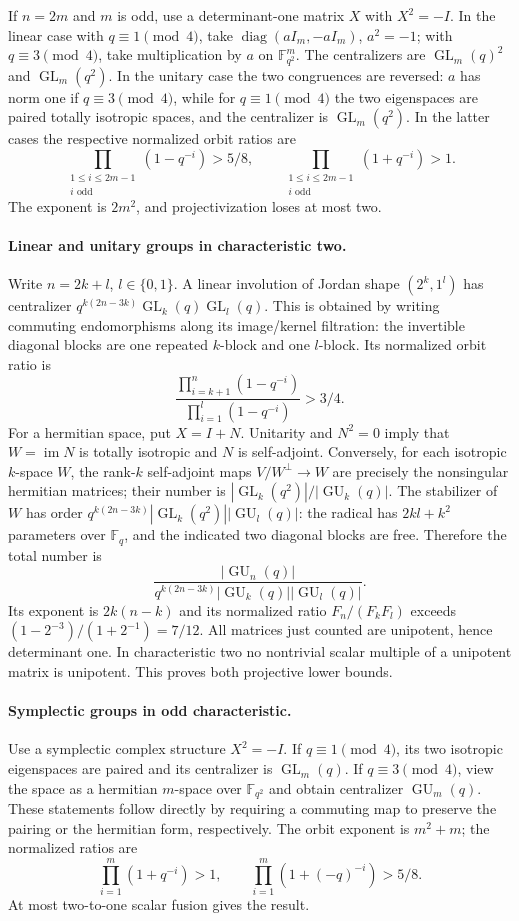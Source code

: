 \documentclass[10pt]{article}
\newcommand{\GL}{\operatorname{GL}}
\newcommand{\GU}{\operatorname{GU}}
\newcommand{\F}{\mathbb F}
\begin{document}
If $n=2m$ and $m$ is odd, use a determinant-one matrix $X$ with
$X^2=-I$. In the linear case with $q\equiv1\pmod4$, take
$\operatorname{diag}(aI_m,-aI_m)$, $a^2=-1$; with $q\equiv3\pmod4$,
take multiplication by $a$ on $\F_{q^2}^m$. The centralizers are
$\GL_m(q)^2$ and $\GL_m(q^2)$. In the unitary case the two congruences
are reversed: $a$ has norm one if $q\equiv3\pmod4$, while for
$q\equiv1\pmod4$ the two eigenspaces are paired totally isotropic spaces,
and the centralizer is $\GL_m(q^2)$. In the latter cases the respective
normalized orbit ratios are
\[
\prod_{\substack{1\le i\le2m-1\\i\text{ odd}}}(1-q^{-i})>5/8,
\qquad
\prod_{\substack{1\le i\le2m-1\\i\text{ odd}}}(1+q^{-i})>1.
\]
The exponent is $2m^2$, and projectivization loses at most two.

\paragraph{Linear and unitary groups in characteristic two.}
Write $n=2k+l$, $l\in\{0,1\}$. A linear involution of Jordan shape
$(2^k,1^l)$ has centralizer
$q^{k(2n-3k)}\GL_k(q)\GL_l(q)$. This is obtained by writing commuting
endomorphisms along its image/kernel filtration: the invertible diagonal
blocks are one repeated $k$-block and one $l$-block. Its normalized orbit
ratio is
\[
\frac{\prod_{i=k+1}^n(1-q^{-i})}{\prod_{i=1}^l(1-q^{-i})}>3/4.
\]
For a hermitian space, put $X=I+N$. Unitarity and $N^2=0$ imply that
$W=\operatorname{im}N$ is totally isotropic and $N$ is self-adjoint.
Conversely, for each isotropic $k$-space $W$, the rank-$k$ self-adjoint
maps $V/W^{\perp}\longrightarrow W$ are precisely the nonsingular
hermitian matrices; their number is $|\GL_k(q^2)|/|\GU_k(q)|$.
The stabilizer of $W$ has order
$q^{k(2n-3k)}|\GL_k(q^2)||\GU_l(q)|$: the radical has $2kl+k^2$
parameters over $\F_q$, and the indicated two diagonal blocks are free.
Therefore the total number is
\[
\frac{|\GU_n(q)|}{q^{k(2n-3k)}|\GU_k(q)||\GU_l(q)|}.
\]
Its exponent is $2k(n-k)$ and its normalized ratio
$F_n/(F_kF_l)$ exceeds $(1-2^{-3})/(1+2^{-1})=7/12$.
All matrices just counted are unipotent, hence determinant one. In
characteristic two no nontrivial scalar multiple of a unipotent matrix
is unipotent. This proves both projective lower bounds.

\paragraph{Symplectic groups in odd characteristic.}
Use a symplectic complex structure $X^2=-I$. If $q\equiv1\pmod4$, its
two isotropic eigenspaces are paired and its centralizer is $\GL_m(q)$.
If $q\equiv3\pmod4$, view the space as a hermitian $m$-space over
$\F_{q^2}$ and obtain centralizer $\GU_m(q)$. These statements follow
directly by requiring a commuting map to preserve the pairing or the
hermitian form, respectively. The orbit exponent is $m^2+m$; the normalized
ratios are
\[
\prod_{i=1}^m(1+q^{-i})>1,
\qquad
\prod_{i=1}^m(1+(-q)^{-i})>5/8.
\]
At most two-to-one scalar fusion gives the result.
\end{document}
